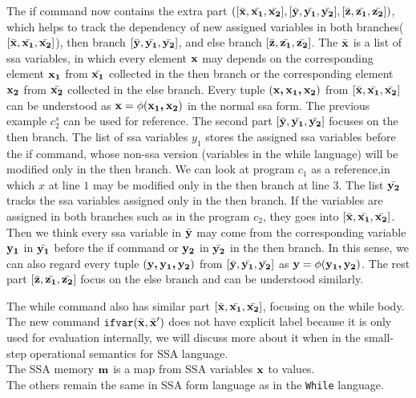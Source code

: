 {
The if command now contains the extra part 
$([\bar{{\boldsymbol{\mathbf{x}}}}, \bar{{\boldsymbol{\mathbf{x_1}}}}, \bar{{\boldsymbol{\mathbf{x_2}}}}] , 
[\bar{{\boldsymbol{\mathbf{y}}}}, \bar{{\boldsymbol{\mathbf{y_1}}}}, \bar{{\boldsymbol{\mathbf{y_2}}}}],
[\bar{{\boldsymbol{\mathbf{z}}}}, \bar{{\boldsymbol{\mathbf{z_1}}}}, \bar{{\boldsymbol{\mathbf{z_2}}}}] )$, 
which helps to track the dependency of new assigned variables in both branches($[\bar{{\boldsymbol{\mathbf{x}}}}, \bar{{\boldsymbol{\mathbf{x_1}}}}, \bar{{\boldsymbol{\mathbf{x_2}}}}]$), 
then branch $[\bar{{\boldsymbol{\mathbf{y}}}}, \bar{{\boldsymbol{\mathbf{y_1}}}}, \bar{{\boldsymbol{\mathbf{y_2}}}}]$, 
and else branch $[\bar{{\boldsymbol{\mathbf{z}}}}, \bar{{\boldsymbol{\mathbf{z_1}}}}, \bar{{\boldsymbol{\mathbf{z_2}}}}] $. 
The $\bar{{\boldsymbol{\mathbf{x}}}}$ is a list of ssa variables, in which every element ${\boldsymbol{\mathbf{x}}}$ may depends on the corresponding element ${\boldsymbol{\mathbf{x_1}}}$ from $\bar{{\boldsymbol{\mathbf{x_1}}}}$ collected in the then branch or the corresponding element ${\boldsymbol{\mathbf{x_2}}}$ from $\bar{{\boldsymbol{\mathbf{x_2}}}}$ collected in the else branch. 
%
Every tuple $({\boldsymbol{\mathbf{x,x_1,x_2 }}})$ from $[\bar{{\boldsymbol{\mathbf{x}}}}, \bar{{\boldsymbol{\mathbf{x_1}}}}, \bar{{\boldsymbol{\mathbf{x_2}}}}]$ can be understood as ${\boldsymbol{\mathbf{x}}} = \phi({\boldsymbol{\mathbf{x_1,x_2}}})$ in the normal ssa form. 
The previous example $c_2^{s}$ can be used for reference. 
The second part $[\bar{{\boldsymbol{\mathbf{y}}}}, \bar{{\boldsymbol{\mathbf{y_1}}}}, \bar{{\boldsymbol{\mathbf{y_2}}}}]$ focuses on the then branch. 
The list of ssa variables $y_1$ stores the assigned ssa variables before the if command, whose non-ssa version (variables in the while language) will be modified only in the then branch. 
We can look at program $c_1$ as a reference,in which $x$ at line $1$ may be modified only in the then branch at line $3$. 
The list $\bar{{\boldsymbol{\mathbf{y_2}}}}$ tracks the ssa variables assigned only in the then branch. 
If the variables are assigned in both branches such as in the program $c_2$, they goes into $[\bar{{\boldsymbol{\mathbf{x}}}}, \bar{{\boldsymbol{\mathbf{x_1}}}}, \bar{{\boldsymbol{\mathbf{x_2}}}}]$. Then we think every ssa variable in $\bar{{\boldsymbol{\mathbf{y}}}}$ may come from the corresponding variable ${\boldsymbol{\mathbf{y_1}}}$ in $\bar{{\boldsymbol{\mathbf{y_1}}}}$ before the if command or ${\boldsymbol{\mathbf{y_2}}}$ in $\bar{{\boldsymbol{\mathbf{y_2}}}}$ in the then branch. 
In this sense, we can also regard every tuple $({\boldsymbol{\mathbf{y,y_1,y_2 }}})$ from $[\bar{{\boldsymbol{\mathbf{y}}}}, \bar{{\boldsymbol{\mathbf{y_1}}}}, \bar{{\boldsymbol{\mathbf{y_2}}}}]$ as ${\boldsymbol{\mathbf{y}}} = \phi({\boldsymbol{\mathbf{y_1,y_2}}})$. 
The rest part $[\bar{{\boldsymbol{\mathbf{z}}}}, \bar{{\boldsymbol{\mathbf{z_1}}}}, \bar{{\boldsymbol{\mathbf{z_2}}}}]$ focus on the else branch and can be understood similarly. 
}

The while command also has similar part $ [\bar{{\boldsymbol{\mathbf{x}}}}, \bar{{\boldsymbol{\mathbf{x_1}}}}, \bar{{\boldsymbol{\mathbf{x_2}}}}]$, focusing on the while body. 
The new command ${{\mathtt{ifvar}(\bar{{\boldsymbol{\mathbf{x}}}}, \bar{{\boldsymbol{\mathbf{x}}}}')}}$ does not have explicit label because it is only used for evaluation internally, we will discuss more about it when in the 
small-step operational semantics for SSA language. 
%
\\
The SSA memory ${\boldsymbol{\mathbf{m}}}$ is a map from SSA variables ${\boldsymbol{\mathbf{x}}}$ to values.
%
\\
The others remain the same in SSA form language as in the {\tt While} language.
%
%
%
